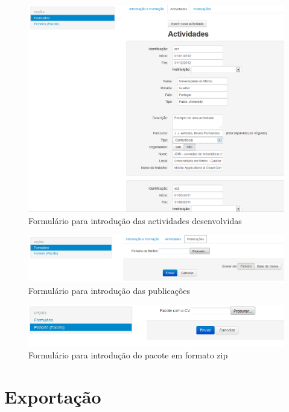 \documentclass[a4paper,11pt,openright,openbib]{article}
\begin{document}
\begin{figure}[!ht]
\centering
\includegraphics[scale=0.6]{iActivities.png}
\caption{Formulário para introdução das actividades desenvolvidas}
\label{fig:iActivities}
\end{figure}
\begin{figure}[!ht]
\centering
\includegraphics[scale=0.6]{iPublications.png}
\caption{Formulário para introdução das publicações}
\label{fig:iPublications}
\end{figure}
\begin{figure}[!ht]
\centering
\includegraphics[scale=0.6]{bypacote.png}
\caption{Formulário para introdução do pacote em formato zip}
\label{fig:bypacote}
\end{figure}
\section{Exportação}
\end{document}
